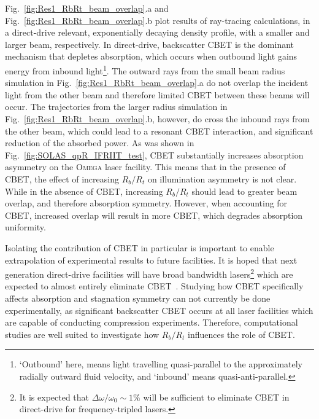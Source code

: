 Fig.~\ref{fig:Res1_RbRt_beam_overlap}.a and Fig.~\ref{fig:Res1_RbRt_beam_overlap}.b plot results of ray-tracing calculations, in a direct-drive relevant, exponentially decaying density profile, with a smaller and larger beam, respectively.
In direct-drive, backscatter \ac{CBET} is the dominant mechanism that depletes absorption, which occurs when outbound light gains energy from inbound light\footnote{`Outbound' here, means light travelling quasi-parallel to the approximately radially outward fluid velocity, and `inbound' means quasi-anti-parallel.}.
The outward rays from the small beam radius simulation in Fig.~\ref{fig:Res1_RbRt_beam_overlap}.a do not overlap the incident light from the other beam and therefore limited \ac{CBET} between these beams will occur.
The trajectories from the larger radius simulation in Fig.~\ref{fig:Res1_RbRt_beam_overlap}.b, however, do cross the inbound rays from the other beam, which could lead to a resonant \ac{CBET} interaction, and significant reduction of the absorbed power.
As was shown in Fig.~\ref{fig:SOLAS_qpR_IFRIIT_test}, \ac{CBET} substantially increases absorption asymmetry on the \textsc{Omega} laser facility.
This means that in the presence of \ac{CBET}, the effect of increasing $R_b/R_t$ on illumination asymmetry is not clear.
While in the absence of \ac{CBET}, increasing $R_b/R_t$ should lead to greater beam overlap, and therefore absorption symmetry.
However, when accounting for \ac{CBET}, increased overlap will result in more \ac{CBET}, which degrades absorption uniformity.

Isolating the contribution of \ac{CBET} in particular is important to enable extrapolation of experimental results to future facilities.
It is hoped that next generation direct-drive facilities will have broad bandwidth lasers\footnote{It is expected that $\Delta\omega/\omega_0\sim1\%$ will be sufficient to eliminate \ac{CBET} in direct-drive for frequency-tripled lasers.} which are expected to almost entirely eliminate \ac{CBET}~\cite{bates_mitigation_2018,bates_suppressing_2023,follett_ray-based_2023}.
Studying how \ac{CBET} specifically affects absorption and stagnation symmetry can not currently be done experimentally, as significant backscatter \ac{CBET} occurs at all laser facilities which are capable of conducting compression experiments.
Therefore, computational studies are well suited to investigate how $R_b/R_t$ influences the role of \ac{CBET}.

